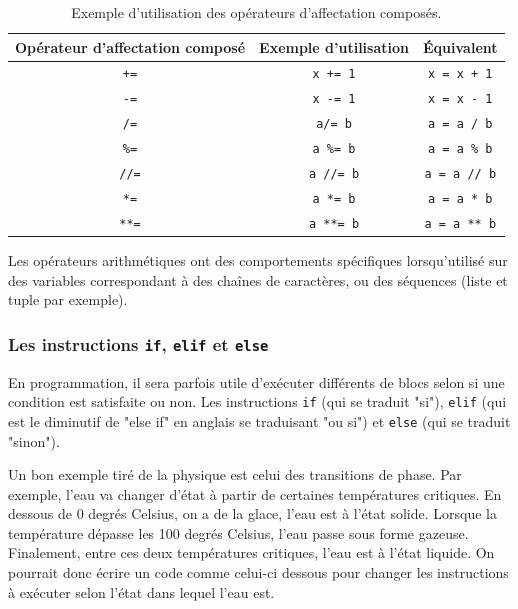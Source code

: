 \documentclass[titlepage]{article}
\theoremstyle{cleanremark}
\begin{document}
\begin{table}[b!]
    \centering
    \begin{tabular}{c|c|c}
         Opérateur d'affectation composé & Exemple d'utilisation & Équivalent \\
        \hline 
        \hline
        \texttt{+=}       & \texttt{x += 1} & \texttt{x = x + 1} \\
        \texttt{-=}       & \texttt{x -= 1} & \texttt{x = x - 1}\\
        \texttt{/=}       & \texttt{a/= b} & \texttt{a = a / b}\\
        \texttt{\%=}       & \texttt{a \%= b} & \texttt{a = a \% b}  \\
        \texttt{//=}       &  \texttt{a //= b} & \texttt{a = a // b}\\
        \texttt{*=}       & \texttt{a *= b} & \texttt{a = a * b}\\
        \texttt{**=}       & \texttt{a **= b} & \texttt{a = a ** b} 
    \end{tabular}
    \caption{Exemple d'utilisation des opérateurs d'affectation composés.}
    \label{tab:ops_affectation}
\end{table}
Les opérateurs arithmétiques ont des comportements spécifiques lorsqu'utilisé sur des variables correspondant à des chaînes de caractères, ou des séquences (liste et tuple par exemple). 

\subsubsection{Les instructions \texttt{if}, \texttt{elif} et \texttt{else}}
En programmation, il sera parfois utile d'exécuter différents de blocs selon si une condition est satisfaite ou non. Les instructions \texttt{if} (qui se traduit "si"), \texttt{elif} (qui est le diminutif de "else if" en anglais se traduisant "ou si") et \texttt{else} (qui se traduit "sinon"). 

Un bon exemple tiré de la physique est celui des transitions de phase. Par exemple, l'eau va changer d'état à partir de certaines températures critiques. En dessous de 0 degrés Celsius, on a de la glace, l'eau est à l'état solide. Lorsque la température dépasse les 100 degrés Celsius, l'eau passe sous forme gazeuse. Finalement, entre ces deux températures critiques, 
l'eau est à l'état liquide. On pourrait donc écrire un code comme celui-ci dessous pour changer les instructions à exécuter selon l'état dans lequel l'eau est.
\end{document}
